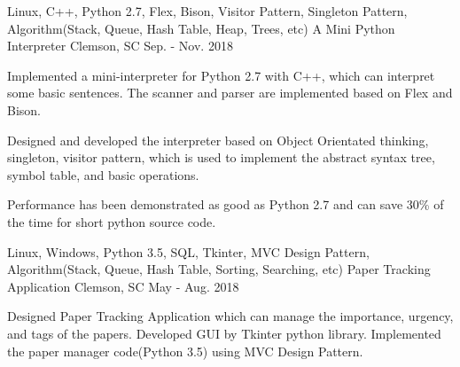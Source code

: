 \begin{cventries}
  \cventry
    {Linux, C++, Python 2.7, Flex, Bison, Visitor Pattern, Singleton Pattern, Algorithm(Stack, Queue, Hash Table, Heap, Trees, etc)} %
    {A Mini Python Interpreter} %
    {Clemson, SC} %
    {Sep. - Nov. 2018} %
    {
      \begin{cvitems} %
        \item {Implemented a mini-interpreter for Python 2.7 with C++, which can interpret some basic sentences. The scanner and parser are implemented based on Flex and Bison.}
        \item {Designed and developed the interpreter based on Object Orientated thinking, singleton, visitor pattern, which is used to implement the abstract syntax tree, symbol table, and basic operations.}
        \item {Performance has been demonstrated as good as Python 2.7 and can save 30\% of the time for short python source code.}
      \end{cvitems}
    }



 

  \cventry
    {Linux, Windows, Python 3.5, SQL, Tkinter, MVC Design Pattern, Algorithm(Stack, Queue, Hash Table, Sorting, Searching, etc)} %
    {Paper Tracking Application} %
    {Clemson, SC} %
    {May - Aug. 2018}%
    {
      \begin{cvitems} %
        \item{Designed Paper Tracking Application which can manage the importance, urgency, and tags of the papers. Developed GUI by Tkinter python library. Implemented the paper manager code(Python 3.5) using MVC Design Pattern.}
      \end{cvitems}
    }


\end{cventries}
